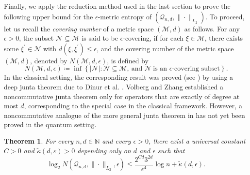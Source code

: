 \documentclass{amsbook}
\newtheorem{theorem}{Theorem}[chapter]
\theoremstyle{definition}
\theoremstyle{remark}
\numberwithin{section}{chapter}
\numberwithin{equation}{chapter}
\newcommand{\1}{\mathbf{1}}
\begin{document}
Finally, we apply the reduction method used in the last section to prove the following upper bound for the $\epsilon$-metric entropy of $(\mathcal{Q}_{n,d}, \|\cdot\|_{L_2})$. To proceed, let us recall the \emph{covering number} of a metric space $(\mathcal{M},d)$ as follows. For any $\epsilon>0$, the subset $\mathcal{N}\subseteq \mathcal{M}$ is said to be $\epsilon$-covering, if for each $\xi\in \mathcal{M}$, there exists some $\xi^{\prime}\in \mathcal{N}$ with $d(\xi,\xi^{\prime})\leq\epsilon$, and the covering number of the metric space $(\mathcal{M},d)$, denoted by $N(\mathcal{M},d,\epsilon)$, is defined by
\[
N(\mathcal{M},d,\epsilon)\coloneqq \inf\left\{|\mathcal{N}|:\mathcal{N}\subseteq \mathcal{M},~\mbox{and }\mathcal{N}~\mbox{is an }\mbox{$\epsilon$-covering subset}\right\}.
\]
In the classical setting, the corresponding result was proved (see \cite{EIS2023}) by using a deep junta theorem due to Dinur et al. \cite{DFKO2007}. Volberg and Zhang \cite{VZ2024} established a noncommutative junta theorem only for operators that are exactly of degree at most $d$, corresponding to the special case in the classical framework.  However,  a noncommutative analogue of the more general junta theorem in  \cite{DFKO2007} has not yet been proved in the quantum setting.

\begin{theorem}\label{mn-thm9(23)}
	For every $n,d\in\mathbb N$ and every $\epsilon>0$, there exist a universal constant $C>0$ and 
	$\widetilde{\kappa}(d,\varepsilon)>0$ depending only on $d$ and $\epsilon$ such that
	\[
	\log_2 N \left(\mathcal Q_{n,d},\|\cdot\|_{L_2},\epsilon\right)
	\le
	\frac{2^{Cd}3^{2d}}{\epsilon^4}\log n+\widetilde{\kappa}(d,\epsilon).
	\]
\end{theorem}
\end{document}
